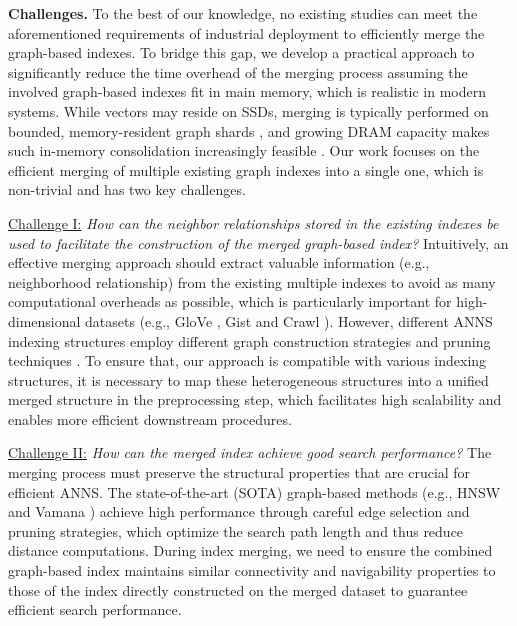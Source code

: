 \documentclass[acmsmall]{acmart}
\theoremstyle{remark}
\theoremstyle{definition}
\begin{document}
\bgroup
\setlength{\parskip}{2pt}
\noindent\textbf{Challenges.} To the best of our knowledge, no existing studies \cite{malkov2018efficient,fu2017fast,jayaram2019diskann,peng2023efficient,dong2011efficient,fu2016efanna} can meet the aforementioned requirements of industrial deployment to efficiently merge the graph-based indexes. To bridge this gap, we develop a practical approach to significantly reduce the time overhead of the merging process 
assuming the involved graph-based indexes fit in main memory, which is realistic in modern systems. While vectors may reside on SSDs, merging is typically performed on bounded, memory-resident graph shards \cite{zhong2025vsag}, and growing DRAM capacity makes such in-memory consolidation increasingly feasible \cite{wang2021comprehensive, azizi2025graph}.
Our work focuses on the efficient merging of multiple existing graph indexes into a single one, which is non-trivial and has two key challenges.

\noindent\underline{Challenge I:} \textit{How can the neighbor relationships stored in the existing indexes be used to facilitate the construction of the merged graph-based index?} Intuitively, an effective merging approach should extract valuable information (e.g., neighborhood relationship) from the existing multiple indexes to avoid as many computational overheads as possible, which is particularly important for high-dimensional datasets (e.g., GloVe \cite{pennington2014glove}, Gist \cite{jegou2010product} and Crawl \cite{commoncrawl}). However, different ANNS indexing structures employ different graph construction strategies and pruning techniques \cite{wang2021comprehensive}. To ensure that, our approach is compatible with various indexing structures, it is necessary to map these heterogeneous structures into a unified merged structure in the preprocessing step, which facilitates high scalability and enables more efficient downstream procedures.

\noindent\underline{Challenge II:} \textit{How can the merged index achieve good search performance?} The merging process must preserve the structural properties that are crucial for efficient ANNS. The state-of-the-art (SOTA) graph-based methods (e.g., HNSW \cite{malkov2018efficient} and Vamana \cite{fu2017fast})  achieve high performance through careful edge selection and pruning strategies, which optimize the search path length and thus reduce distance computations. During index merging, we need to ensure the combined graph-based index maintains similar connectivity and navigability properties to those of the index directly constructed on the merged dataset to guarantee efficient search performance.
\end{document}
